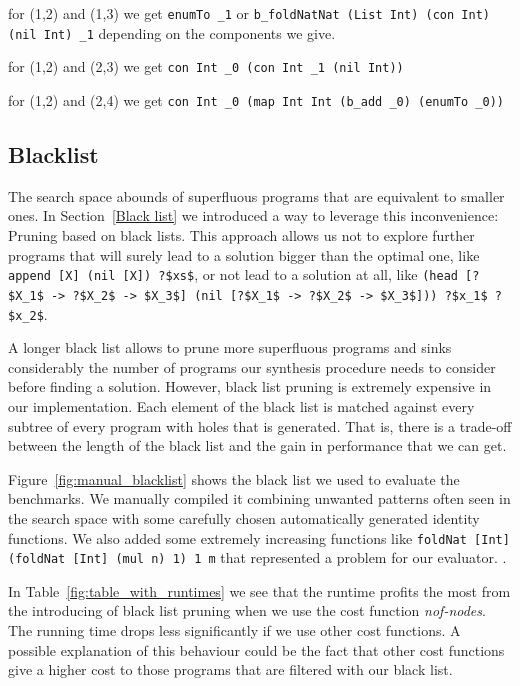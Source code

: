 for (1,2) and (1,3) we get \lstinline?enumTo _1? or \lstinline?b_foldNatNat (List Int) (con Int) (nil Int) _1? depending on the components we give.

for (1,2) and (2,3) we get \lstinline?con Int _0 (con Int _1 (nil Int))?

for (1,2) and (2,4) we get \lstinline?con Int _0 (map Int Int (b_add _0) (enumTo _0))? 

\subsection{Blacklist}
The search space abounds of superfluous programs that are equivalent to smaller ones. In Section~\ref{Black list} we introduced a way to leverage this inconvenience: Pruning based on black lists. This approach allows us not to explore further programs that will surely lead to a solution bigger than the optimal one, like \lstinline!append [X] (nil [X]) ?$xs$!, or not lead to a solution at all, like \lstinline!(head [?$X_1$ -> ?$X_2$ -> $X_3$] (nil [?$X_1$ -> ?$X_2$ -> $X_3$])) ?$x_1$ ?$x_2$!.

A longer black list allows to prune more superfluous programs and sinks considerably the number of programs our synthesis procedure needs to consider before finding a solution. However, black list pruning is extremely expensive in our implementation. Each element of the black list is matched against every subtree of every program with holes that is generated. That is, there is a trade-off between the length of the black list and the gain in performance that we can get.

Figure~\ref{fig:manual_blacklist} shows the black list  we used to evaluate the benchmarks. We manually compiled it combining unwanted patterns often seen in the search space with some carefully chosen automatically generated identity functions. We also added some extremely increasing functions like \lstinline!foldNat [Int] (foldNat [Int] (mul n) 1) 1 m! that represented a problem for our evaluator.
.

In Table~\ref{fig:table_with_runtimes} we see that the runtime profits the most from the introducing of black list pruning when we use the cost function \textit{nof-nodes}.
The running time drops less significantly if we use other cost functions. A possible explanation of this behaviour could be the fact that other cost functions give a higher cost to those programs that are filtered with our black list.

